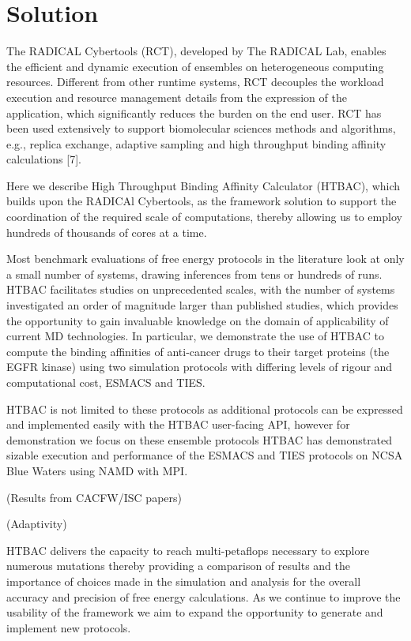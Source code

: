 \documentclass[conference]{IEEEtran}
\begin{document}
\section{Solution}\label{sec:solution}

The RADICAL Cybertools (RCT), developed by The RADICAL Lab, enables the 
efficient and dynamic execution of ensembles on heterogeneous computing 
resources. Different from other runtime systems, RCT decouples the workload 
execution and resource management details from the expression of the 
application, which significantly reduces the burden on the end user. 
RCT has been used extensively to support 
biomolecular sciences methods and algorithms, e.g., replica exchange, adaptive
sampling and high throughput binding affinity calculations [7]. 

Here we describe High Throughput Binding Affinity Calculator (HTBAC), 
which builds upon the RADICAl Cybertools, as the framework solution to support 
the coordination of the required scale of computations, thereby 
allowing us to employ hundreds of thousands of cores at a time.

Most benchmark evaluations of free energy protocols in the literature look 
at only a small number of systems, drawing inferences from tens or hundreds 
of runs. HTBAC facilitates studies on unprecedented scales, with the number 
of systems investigated an order of magnitude larger than published studies, 
which provides the opportunity to gain invaluable knowledge on the domain of 
applicability of current MD technologies. In particular, we demonstrate the 
use of HTBAC to compute the binding affinities of anti-cancer drugs to their 
target proteins (the EGFR kinase) using two simulation protocols with differing 
levels of rigour and computational cost, ESMACS and TIES.

HTBAC is not limited to these protocols as additional protocols can be 
expressed and implemented easily with the HTBAC user-facing API, however for 
demonstration we focus on these ensemble protocols HTBAC has demonstrated 
sizable execution and performance of the ESMACS and TIES protocols on NCSA 
Blue Waters using NAMD with MPI. 

(Results from CACFW/ISC papers)

(Adaptivity)

HTBAC delivers the capacity to reach multi-petaflops necessary to explore 
numerous mutations thereby providing a comparison of results and the importance 
of choices made in the simulation and analysis for the overall accuracy and 
precision of free energy calculations. As we continue to improve the 
usability of the framework we aim to expand the opportunity to generate and 
implement new protocols. 
\end{document}
